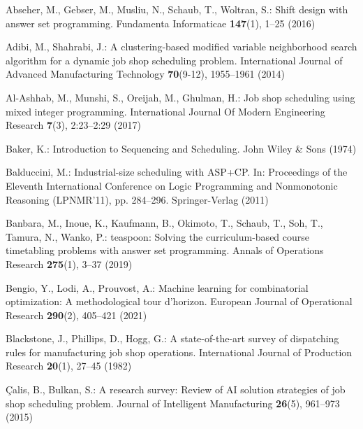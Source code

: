 \begin{thebibliography}{10}
\providecommand{\url}[1]{\texttt{#1}}
\providecommand{\urlprefix}{URL }
\providecommand{\doi}[1]{https://doi.org/#1}

Abseher, M., Gebser, M., Musliu, N., Schaub, T., Woltran, S.: Shift design with
  answer set programming. Fundamenta Informaticae  \textbf{147}(1),  1--25
  (2016)

Adibi, M., Shahrabi, J.: A clustering-based modified variable neighborhood
  search algorithm for a dynamic job shop scheduling problem. International
  Journal of Advanced Manufacturing Technology  \textbf{70}(9-12),  1955--1961
  (2014)

Al-Ashhab, M., Munshi, S., Oreijah, M., Ghulman, H.: Job shop scheduling using
  mixed integer programming. International Journal Of Modern Engineering
  Research  \textbf{7}(3),  2:23--2:29 (2017)

Baker, K.: Introduction to Sequencing and Scheduling. John Wiley \& Sons (1974)

Balduccini, M.: Industrial-size scheduling with {ASP}+{CP}. In: Proceedings of
  the Eleventh International Conference on Logic Programming and Nonmonotonic
  Reasoning (LPNMR'11), pp. 284--296. Springer-Verlag (2011)

Banbara, M., Inoue, K., Kaufmann, B., Okimoto, T., Schaub, T., Soh, T., Tamura,
  N., Wanko, P.: teaspoon: Solving the curriculum-based course timetabling
  problems with answer set programming. Annals of Operations Research
  \textbf{275}(1),  3--37 (2019)

Bengio, Y., Lodi, A., Prouvost, A.: Machine learning for combinatorial
  optimization: A methodological tour d'horizon. European Journal of
  Operational Research  \textbf{290}(2),  405--421 (2021)

Blackstone, J., Phillips, D., Hogg, G.: A state-of-the-art survey of
  dispatching rules for manufacturing job shop operations. International
  Journal of Production Research  \textbf{20}(1),  27--45 (1982)

{\c{C}}alis, B., Bulkan, S.: A research survey: Review of {AI} solution
  strategies of job shop scheduling problem. Journal of Intelligent
  Manufacturing  \textbf{26}(5),  961--973 (2015)


\end{thebibliography}
